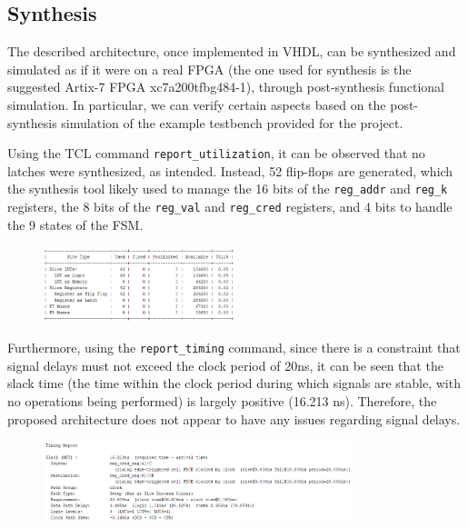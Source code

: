 \documentclass{article}
\begin{document}
\subsection{Synthesis}

The described architecture, once implemented in VHDL, can be synthesized and simulated as if it were on a real FPGA (the one used for synthesis is the suggested Artix-7 FPGA xc7a200tfbg484-1), through post-synthesis functional simulation. In particular, we can verify certain aspects based on the post-synthesis simulation of the example testbench provided for the project.

Using the TCL command \texttt{report\_utilization}, it can be observed that no latches were synthesized, as intended. Instead, 52 flip-flops are generated, which the synthesis tool likely used to manage the 16 bits of the \texttt{reg\_addr} and \texttt{reg\_k} registers, the 8 bits of the \texttt{reg\_val} and \texttt{reg\_cred} registers, and 4 bits to handle the 9 states of the FSM.

\begin{figure}[h]
    \centering
    \includegraphics[width=0.5\textwidth]{report flip-flop used.png}
    \label{fig:Report utilization: Number of flip-flops used}
\end{figure}

Furthermore, using the \texttt{report\_timing} command, since there is a constraint that signal delays must not exceed the clock period of 20ns, it can be seen that the slack time (the time within the clock period during which signals are stable, with no operations being performed) is largely positive (16.213 ns). Therefore, the proposed architecture does not appear to have any issues regarding signal delays.

\begin{figure}[h]
    \centering
    \includegraphics[width=0.8\textwidth]{report slack-time.png}
    \label{fig:Report timing: Slack Time}
\end{figure}
\end{document}
